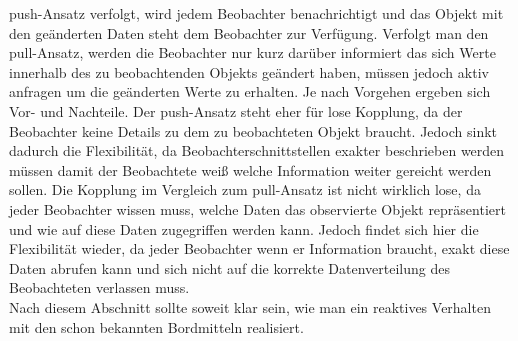 push-Ansatz verfolgt, wird jedem Beobachter benachrichtigt und das Objekt mit den geänderten Daten steht dem Beobachter zur Verfügung. Verfolgt man den pull-Ansatz, werden die Beobachter nur kurz darüber informiert das sich Werte innerhalb des zu beobachtenden Objekts geändert haben, müssen jedoch aktiv anfragen um die geänderten Werte zu erhalten. Je nach Vorgehen ergeben sich Vor- und Nachteile. Der push-Ansatz steht eher für lose Kopplung, da der Beobachter keine Details zu dem zu beobachteten Objekt braucht. Jedoch sinkt dadurch die Flexibilität, da Beobachterschnittstellen exakter beschrieben werden müssen damit der Beobachtete weiß welche Information weiter gereicht werden sollen. Die Kopplung im Vergleich zum pull-Ansatz ist nicht wirklich lose, da jeder Beobachter wissen muss, welche Daten das observierte Objekt repräsentiert und wie auf diese Daten zugegriffen werden kann. Jedoch findet sich hier die Flexibilität wieder, da jeder Beobachter wenn er Information braucht, exakt diese Daten abrufen kann und sich nicht auf die korrekte Datenverteilung des Beobachteten verlassen muss. \\ Nach diesem Abschnitt sollte soweit klar sein, wie man ein reaktives Verhalten mit den schon bekannten Bordmitteln realisiert.
